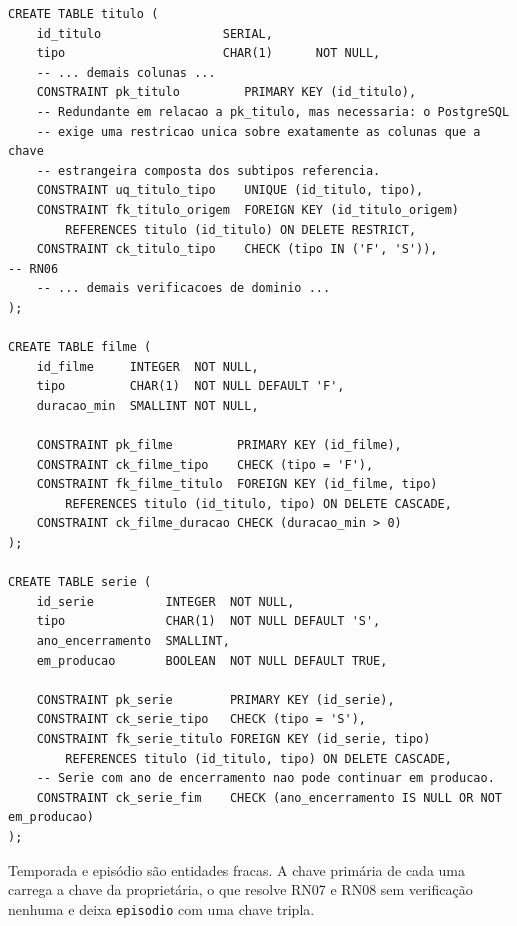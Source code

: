 \documentclass[a4paper,12pt,oneside,openany]{book}
\newcommand{\bd}[1]{\texttt{#1}}
\begin{document}
\begin{lstlisting}[caption={Especialização por chave primária compartilhada mais discriminador.},label={lst:especializacao},basicstyle=\ttfamily\scriptsize]
CREATE TABLE titulo (
    id_titulo                 SERIAL,
    tipo                      CHAR(1)      NOT NULL,
    -- ... demais colunas ...
    CONSTRAINT pk_titulo         PRIMARY KEY (id_titulo),
    -- Redundante em relacao a pk_titulo, mas necessaria: o PostgreSQL
    -- exige uma restricao unica sobre exatamente as colunas que a chave
    -- estrangeira composta dos subtipos referencia.
    CONSTRAINT uq_titulo_tipo    UNIQUE (id_titulo, tipo),
    CONSTRAINT fk_titulo_origem  FOREIGN KEY (id_titulo_origem)
        REFERENCES titulo (id_titulo) ON DELETE RESTRICT,
    CONSTRAINT ck_titulo_tipo    CHECK (tipo IN ('F', 'S')),           -- RN06
    -- ... demais verificacoes de dominio ...
);

CREATE TABLE filme (
    id_filme     INTEGER  NOT NULL,
    tipo         CHAR(1)  NOT NULL DEFAULT 'F',
    duracao_min  SMALLINT NOT NULL,

    CONSTRAINT pk_filme         PRIMARY KEY (id_filme),
    CONSTRAINT ck_filme_tipo    CHECK (tipo = 'F'),
    CONSTRAINT fk_filme_titulo  FOREIGN KEY (id_filme, tipo)
        REFERENCES titulo (id_titulo, tipo) ON DELETE CASCADE,
    CONSTRAINT ck_filme_duracao CHECK (duracao_min > 0)
);

CREATE TABLE serie (
    id_serie          INTEGER  NOT NULL,
    tipo              CHAR(1)  NOT NULL DEFAULT 'S',
    ano_encerramento  SMALLINT,
    em_producao       BOOLEAN  NOT NULL DEFAULT TRUE,

    CONSTRAINT pk_serie        PRIMARY KEY (id_serie),
    CONSTRAINT ck_serie_tipo   CHECK (tipo = 'S'),
    CONSTRAINT fk_serie_titulo FOREIGN KEY (id_serie, tipo)
        REFERENCES titulo (id_titulo, tipo) ON DELETE CASCADE,
    -- Serie com ano de encerramento nao pode continuar em producao.
    CONSTRAINT ck_serie_fim    CHECK (ano_encerramento IS NULL OR NOT em_producao)
);
\end{lstlisting}

Temporada e episódio são entidades fracas. A chave primária de cada uma
carrega a chave da proprietária, o que resolve RN07 e RN08 sem verificação
nenhuma e deixa \bd{episodio} com uma chave tripla.
\end{document}
